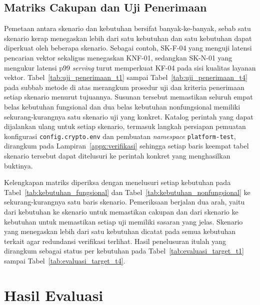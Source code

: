 \subsection{Matriks Cakupan dan Uji Penerimaan}
\label{subsec:cakupan}

Pemetaan antara skenario dan kebutuhan bersifat banyak-ke-banyak, sebab satu skenario kerap menegaskan lebih dari satu kebutuhan dan satu kebutuhan dapat diperkuat oleh beberapa skenario. Sebagai contoh, SK-F-04 yang menguji latensi pencarian vektor sekaligus menegaskan KNF-01, sedangkan SK-N-01 yang mengukur latensi p99 \textit{serving} turut memperkuat KF-04 pada sisi kualitas layanan vektor. Tabel~\ref{tab:uji_penerimaan_t1} sampai Tabel~\ref{tab:uji_penerimaan_t4} pada subbab metode di atas merangkum prosedur uji dan kriteria penerimaan setiap skenario menurut tujuannya. Susunan tersebut memastikan seluruh empat belas kebutuhan fungsional dan dua belas kebutuhan nonfungsional memiliki sekurang-kurangnya satu skenario uji yang konkret. Katalog perintah yang dapat dijalankan ulang untuk setiap skenario, termasuk langkah persiapan pemuatan konfigurasi \texttt{config.crypto.env} dan pembuatan \textit{namespace} \texttt{platform-test}, dirangkum pada Lampiran~\ref{appx:verifikasi} sehingga setiap baris keempat tabel skenario tersebut dapat ditelusuri ke perintah konkret yang menghasilkan buktinya.

Kelengkapan matriks diperiksa dengan menelusuri setiap kebutuhan pada Tabel~\ref{tab:kebutuhan_fungsional} dan Tabel~\ref{tab:kebutuhan_nonfungsional} ke sekurang-kurangnya satu baris skenario. Pemeriksaan berjalan dua arah, yaitu dari kebutuhan ke skenario untuk memastikan cakupan dan dari skenario ke kebutuhan untuk memastikan setiap uji memiliki sasaran yang jelas. Skenario yang menegaskan lebih dari satu kebutuhan dicatat pada semua kebutuhan terkait agar redundansi verifikasi terlihat. Hasil penelusuran itulah yang dirangkum sebagai status per kebutuhan pada Tabel~\ref{tab:evaluasi_target_t1} sampai Tabel~\ref{tab:evaluasi_target_t4}.

\section{Hasil Evaluasi}
\label{sec:hasil-evaluasi}

